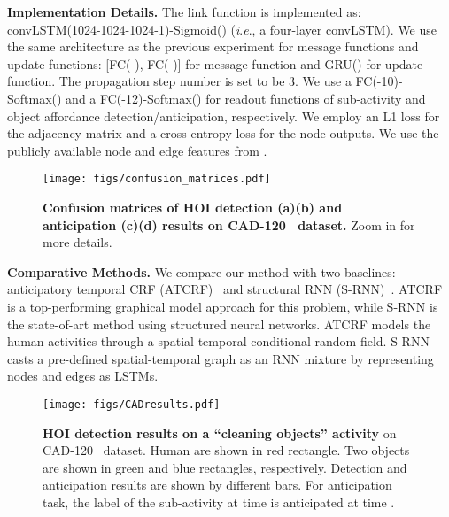 \documentclass[runningheads]{llncs}
\newcommand{\ie}{\textit{i}.\textit{e}.}
\begin{document}
\noindent\textbf{Implementation Details.} The link function is implemented as: convLSTM(1024-1024-1024-1)-Sigmoid() (\ie, a four-layer convLSTM). We use the same architecture as the previous experiment for message functions and update functions: [FC(-), FC(-)] for message function and GRU() for update function. The propagation step number  is set to be 3.
We use a FC(-10)-Softmax() and a FC(-12)-Softmax() for readout functions of sub-activity and object affordance detection/anticipation, respectively. We employ an L1 loss for the adjacency matrix and a cross entropy loss for the node outputs. We use the publicly available node and edge features from \cite{koppula2013learning}.






\begin{figure*}[t]
\centering
\texttt{[image: figs/confusion\_matrices.pdf]}
\caption{\textbf{Confusion matrices of HOI detection (a)(b) and anticipation (c)(d) results on CAD-120~\cite{koppula2016anticipating} dataset.} Zoom in for more details.}
\label{fig:cad_detection_confusion}
\end{figure*}






\noindent\textbf{Comparative Methods.}  We compare our method with two baselines: anticipatory temporal CRF (ATCRF)~\cite{koppula2016anticipating} and structural RNN (S-RNN)~\cite{jain2016structural}. ATCRF is a top-performing graphical model approach for this problem, while S-RNN is the state-of-art method using structured neural networks. ATCRF models the human activities through a spatial-temporal conditional random field. S-RNN casts a pre-defined spatial-temporal graph as an RNN mixture by representing nodes and edges as LSTMs.

\begin{figure*}[t]
\centering
\texttt{[image: figs/CADresults.pdf]}
\caption{\textbf{HOI detection results on a ``cleaning objects'' activity} on CAD-120~\cite{koppula2016anticipating} dataset. Human are shown in red rectangle. Two objects are shown in green and blue rectangles, respectively. Detection and anticipation results are shown by different bars. For anticipation task, the label of the sub-activity at time  is anticipated at time . }
\label{fig:cad_qualitative}
\end{figure*}
\end{document}
